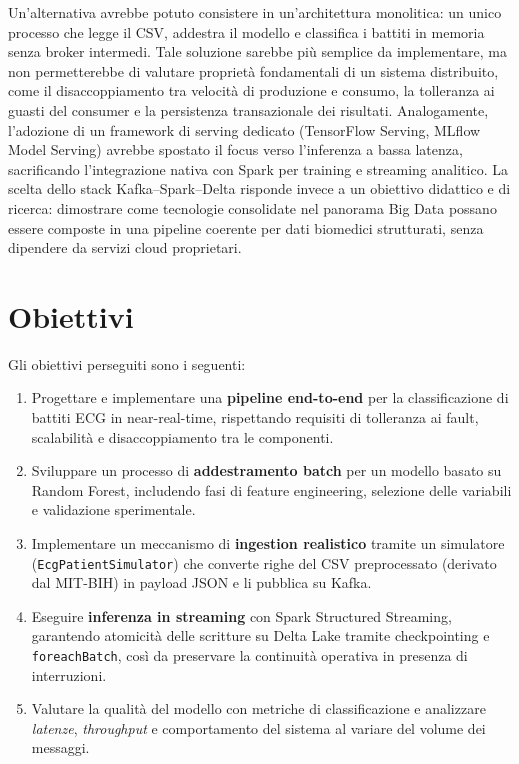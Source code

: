 Un'alternativa avrebbe potuto consistere in un'architettura monolitica: un unico processo che legge il CSV, addestra il modello e classifica i battiti in memoria senza broker intermedi.
Tale soluzione sarebbe più semplice da implementare, ma non permetterebbe di valutare proprietà fondamentali di un sistema distribuito, come il disaccoppiamento tra velocità di produzione e consumo, la tolleranza ai guasti del consumer e la persistenza transazionale dei risultati.
Analogamente, l'adozione di un framework di serving dedicato (TensorFlow Serving, MLflow Model Serving) avrebbe spostato il focus verso l'inferenza a bassa latenza, sacrificando l'integrazione nativa con Spark per training e streaming analitico.
La scelta dello stack Kafka--Spark--Delta risponde invece a un obiettivo didattico e di ricerca: dimostrare come tecnologie consolidate nel panorama Big Data possano essere composte in una pipeline coerente per dati biomedici strutturati, senza dipendere da servizi cloud proprietari.

\section{Obiettivi}\label{sec:obiettivi}
Gli obiettivi perseguiti sono i seguenti:
\begin{enumerate}
  \item Progettare e implementare una \textbf{pipeline end-to-end} per la classificazione di battiti ECG in near-real-time, rispettando requisiti di tolleranza ai fault, scalabilità e disaccoppiamento tra le componenti.
  \item Sviluppare un processo di \textbf{addestramento batch} per un modello basato su Random Forest, includendo fasi di feature engineering, selezione delle variabili e validazione sperimentale.
  \item Implementare un meccanismo di \textbf{ingestion realistico} tramite un simulatore (\texttt{EcgPatientSimulator}) che converte righe del CSV preprocessato (derivato dal MIT-BIH) in payload JSON e li pubblica su Kafka.
  \item Eseguire \textbf{inferenza in streaming} con Spark Structured Streaming, garantendo atomicità delle scritture su Delta Lake tramite checkpointing e \texttt{foreachBatch}, così da preservare la continuità operativa in presenza di interruzioni.
  \item Valutare la qualità del modello con metriche di classificazione e analizzare \emph{latenze}, \emph{throughput} e comportamento del sistema al variare del volume dei messaggi.
\end{enumerate}

